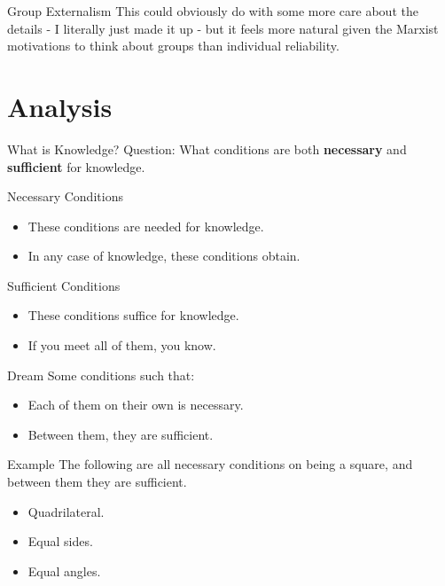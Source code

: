 \documentclass[
  17pt,
  letterpaper,
  ignorenonframetext,
  aspectratio=169,
]{beamer}
\providecommand{\tightlist}{%
  \setlength{\itemsep}{0pt}\setlength{\parskip}{0pt}}\usepackage{longtable,booktabs,array}
\begin{document}
\begin{frame}{Group Externalism}
\protect\hypertarget{group-externalism-1}{}
This could obviously do with some more care about the details - I
literally just made it up - but it feels more natural given the Marxist
motivations to think about groups than individual reliability.
\end{frame}

\hypertarget{analysis}{%
\section{Analysis}\label{analysis}}

\begin{frame}{What is Knowledge?}
\protect\hypertarget{what-is-knowledge}{}
Question: What conditions are both \textbf{necessary} and
\textbf{sufficient} for knowledge.
\end{frame}

\begin{frame}{Necessary Conditions}
\protect\hypertarget{necessary-conditions}{}
\begin{itemize}[<+->]
\tightlist
\item
  These conditions are needed for knowledge.
\item
  In any case of knowledge, these conditions obtain.
\end{itemize}
\end{frame}

\begin{frame}{Sufficient Conditions}
\protect\hypertarget{sufficient-conditions}{}
\begin{itemize}[<+->]
\tightlist
\item
  These conditions suffice for knowledge.
\item
  If you meet all of them, you know.
\end{itemize}
\end{frame}

\begin{frame}{Dream}
\protect\hypertarget{dream}{}
Some conditions such that:

\begin{itemize}[<+->]
\tightlist
\item
  Each of them on their own is necessary.
\item
  Between them, they are sufficient.
\end{itemize}
\end{frame}

\begin{frame}{Example}
\protect\hypertarget{example}{}
The following are all necessary conditions on being a square, and
between them they are sufficient.

\begin{itemize}[<+->]
\tightlist
\item
  Quadrilateral.
\item
  Equal sides.
\item
  Equal angles.
\end{itemize}
\end{frame}
\end{document}
